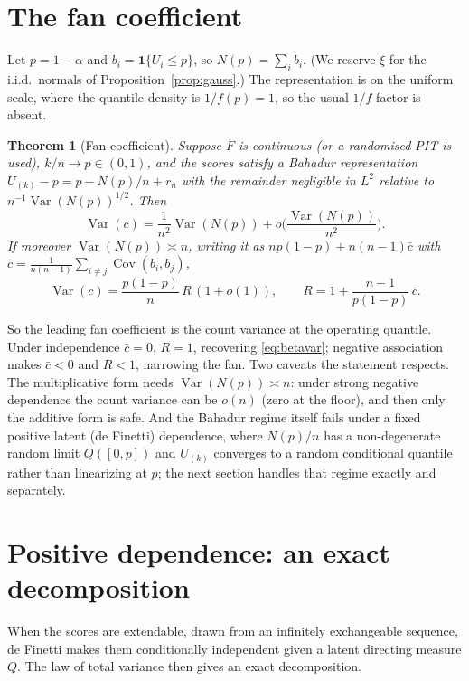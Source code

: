\documentclass[11pt]{article}
\newtheorem{theorem}{Theorem}
\begin{document}
\section{The fan coefficient}

Let $p=1-\alpha$ and $b_i=\mathbf 1\{U_i\le p\}$, so $N(p)=\sum_i b_i$. (We reserve $\xi$ for the
i.i.d.\ normals of Proposition~\ref{prop:gauss}.) The representation is on the uniform scale, where the
quantile density is $1/f(p)=1$, so the usual $1/f$ factor is absent.

\begin{theorem}[Fan coefficient]\label{thm:coeff}
Suppose $F$ is continuous (or a randomised PIT is used), $k/n\to p\in(0,1)$, and the scores satisfy a
Bahadur representation $U_{(k)}-p=p-N(p)/n+r_n$ with the remainder negligible in $L^2$ relative to
$n^{-1}\operatorname{Var}(N(p))^{1/2}$. Then
\begin{equation}
\operatorname{Var}(c)=\frac1{n^2}\operatorname{Var}(N(p))+o\!\Big(\frac{\operatorname{Var}(N(p))}{n^2}\Big).
\end{equation}
If moreover $\operatorname{Var}(N(p))\asymp n$, writing it as
$np(1-p)+n(n-1)\bar c$ with $\bar c=\tfrac1{n(n-1)}\sum_{i\ne j}\operatorname{Cov}(b_i,b_j)$,
\begin{equation}
\operatorname{Var}(c)=\frac{p(1-p)}{n}\,R\,(1+o(1)),\qquad R=1+\frac{n-1}{p(1-p)}\,\bar c .
\end{equation}
\end{theorem}

So the leading fan coefficient is the count variance at the operating quantile. Under
independence $\bar c=0$, $R=1$, recovering \eqref{eq:betavar}; negative association makes $\bar c<0$
and $R<1$, narrowing the fan. Two caveats the statement respects. The multiplicative form needs
$\operatorname{Var}(N(p))\asymp n$: under strong negative dependence the count variance can be
$o(n)$ (zero at the floor), and then only the additive form is safe. And the Bahadur regime itself
fails under a fixed positive latent (de Finetti) dependence, where $N(p)/n$ has a non-degenerate
random limit $Q([0,p])$ and $U_{(k)}$ converges to a random conditional quantile rather than
linearizing at $p$; the next section handles that regime exactly and separately.

\section{Positive dependence: an exact decomposition}

When the scores are extendable, drawn from an infinitely exchangeable sequence, de Finetti
\citep{definetti1937,kerns2006} makes them conditionally independent given a latent directing measure
$Q$. The law of total variance then gives an exact decomposition.
\end{document}
